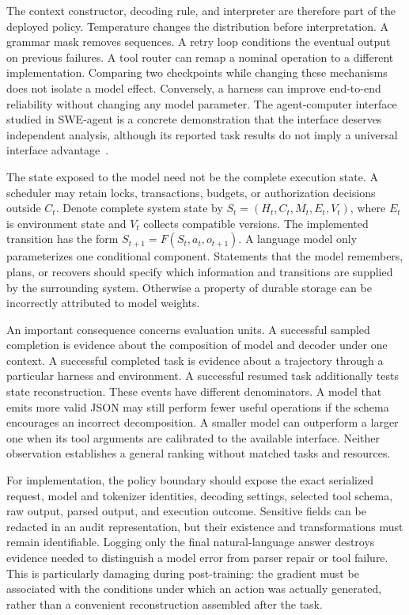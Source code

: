 The context constructor, decoding rule, and interpreter are therefore part of the deployed policy. Temperature changes the distribution before interpretation. A grammar mask removes sequences. A retry loop conditions the eventual output on previous failures. A tool router can remap a nominal operation to a different implementation. Comparing two checkpoints while changing these mechanisms does not isolate a model effect. Conversely, a harness can improve end-to-end reliability without changing any model parameter. The agent-computer interface studied in SWE-agent is a concrete demonstration that the interface deserves independent analysis, although its reported task results do not imply a universal interface advantage~\cite{yang2024sweagent}.

The state exposed to the model need not be the complete execution state. A scheduler may retain locks, transactions, budgets, or authorization decisions outside $C_t$. Denote complete system state by $S_t=(H_t,C_t,M_t,E_t,V_t)$, where $E_t$ is environment state and $V_t$ collects compatible versions. The implemented transition has the form $S_{t+1}=F(S_t,a_t,o_{t+1})$. A language model only parameterizes one conditional component. Statements that the model remembers, plans, or recovers should specify which information and transitions are supplied by the surrounding system. Otherwise a property of durable storage can be incorrectly attributed to model weights.

An important consequence concerns evaluation units. A successful sampled completion is evidence about the composition of model and decoder under one context. A successful completed task is evidence about a trajectory through a particular harness and environment. A successful resumed task additionally tests state reconstruction. These events have different denominators. A model that emits more valid JSON may still perform fewer useful operations if the schema encourages an incorrect decomposition. A smaller model can outperform a larger one when its tool arguments are calibrated to the available interface. Neither observation establishes a general ranking without matched tasks and resources.

For implementation, the policy boundary should expose the exact serialized request, model and tokenizer identities, decoding settings, selected tool schema, raw output, parsed output, and execution outcome. Sensitive fields can be redacted in an audit representation, but their existence and transformations must remain identifiable. Logging only the final natural-language answer destroys evidence needed to distinguish a model error from parser repair or tool failure. This is particularly damaging during post-training: the gradient must be associated with the conditions under which an action was actually generated, rather than a convenient reconstruction assembled after the task.

